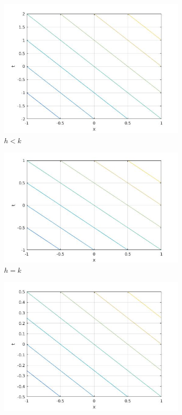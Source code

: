 \begin{figure}[H]
\centering
\begin{subfigure}[b]{0.3\textwidth}
  \includegraphics[width=\textwidth]{Images/advection_hlk.jpg}
  \caption{$h<k$}
  \label{fig:aci1}
\end{subfigure}
\hfill
\begin{subfigure}[b]{0.3\textwidth}
  \includegraphics[width=\textwidth]{Images/advection_h=k.jpg}
  \caption{$h=k$}
  \label{fig:aci2}
\end{subfigure}
\hfill
\begin{subfigure}[b]{0.3\textwidth}
  \includegraphics[width=\textwidth]{Images/advection_hgk.jpg}

\end{subfigure}
\end{figure}
